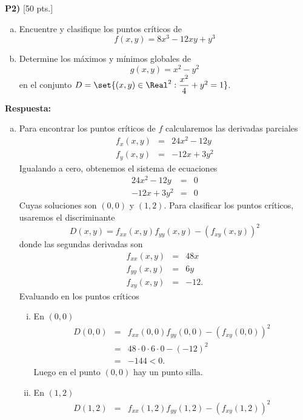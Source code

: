\documentclass{article}
\begin{document}
\newpage
\noindent\textbf{P2) } \textsf{[50 pts.]} 
  \begin{enumerate}[a)]
    \item Encuentre y clasifique los puntos críticos de
        $$f(x,y) = 8x^3-12xy+y^3$$
    \item Determine los máximos y mínimos globales de 
        $$g(x,y) = x^2-y^2$$
      en el conjunto $D = \set{(x,y) \in \Real^2 : \dfrac{x^2}{4}+y^2 = 1}$.
  \end{enumerate}

\vspace{5mm}
\noindent\textbf{Respuesta:}
\begin{enumerate}[a)]
  \item Para encontrar los puntos críticos de $f$ calcularemos las derivadas parciales
      \begin{eqnarray*}
        f_x(x,y) &=& 24x^2 - 12y \\
        f_y(x,y) &=& -12x + 3y^2
      \end{eqnarray*}
    Igualando a cero, obtenemos el sistema de ecuaciones
      \begin{eqnarray*}
        24x^2 - 12y &=& 0 \\
        -12x + 3y^2 &=& 0
      \end{eqnarray*}
    Cuyas soluciones son $(0,0)$ y $(1,2)$. Para clasificar los puntos críticos, usaremos el discriminante
      $$D(x,y) = f_{xx}(x,y)f_{yy}(x,y) - (f_{xy}(x,y))^2$$
    donde las segundas derivadas son
      \begin{eqnarray*}
        f_{xx}(x,y) &=& 48x \\
        f_{yy}(x,y) &=& 6y \\
        f_{xy}(x,y) &=& -12.
      \end{eqnarray*}
    Evaluando en los puntos críticos
    \begin{enumerate}[i)]
      \item En $(0,0)$
        \begin{eqnarray*}
          D(0,0) &=& f_{xx}(0,0)f_{yy}(0,0) - (f_{xy}(0,0))^2 \\
            &=& 48\cdot 0\cdot 6\cdot 0 - (-12)^2 \\
            &=& -144 < 0.
        \end{eqnarray*}
        Luego en el punto $(0,0)$ hay un punto silla.
      \item En $(1,2)$
        \begin{eqnarray*}
          D(1,2) &=& f_{xx}(1,2)f_{yy}(1,2) - (f_{xy}(1,2))^2 \\

\end{eqnarray*}
\end{enumerate}
\end{enumerate}
\end{document}
